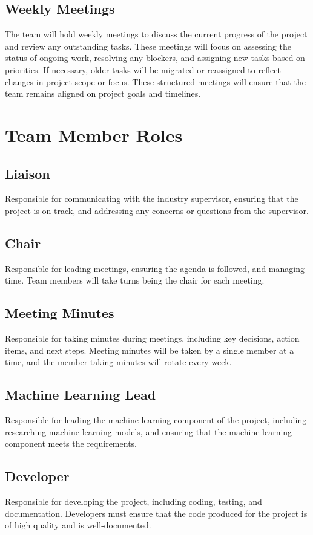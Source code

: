 \documentclass{article}
\begin{document}
\subsection*{Weekly Meetings}
The team will hold weekly meetings to discuss the current progress of the project and review any outstanding tasks. These meetings will focus on assessing the status of ongoing work, resolving any blockers, and assigning new tasks based on priorities. If necessary, older tasks will be migrated or reassigned to reflect changes in project scope or focus. These structured meetings will ensure that the team remains aligned on project goals and timelines.

\section{Team Member Roles}

\subsection*{Liaison} Responsible for communicating with the industry supervisor, ensuring that the project is on track, and addressing any concerns or questions from the supervisor.   
\subsection*{Chair} Responsible for leading meetings, ensuring the agenda is followed, and managing time. Team members will take turns being the chair for each meeting.
\subsection*{Meeting Minutes} Responsible for taking minutes during meetings, including key decisions, action items, and next steps. Meeting minutes will be taken by a single member at a time, and the member taking minutes will rotate every week.
\subsection*{Machine Learning Lead} Responsible for leading the machine learning component of the project, including researching machine learning models, and ensuring that the machine learning component meets the requirements.
\subsection*{Developer} Responsible for developing the project, including coding, testing, and documentation. Developers must ensure that the code produced for the project is of high quality and is well-documented.
\end{document}
